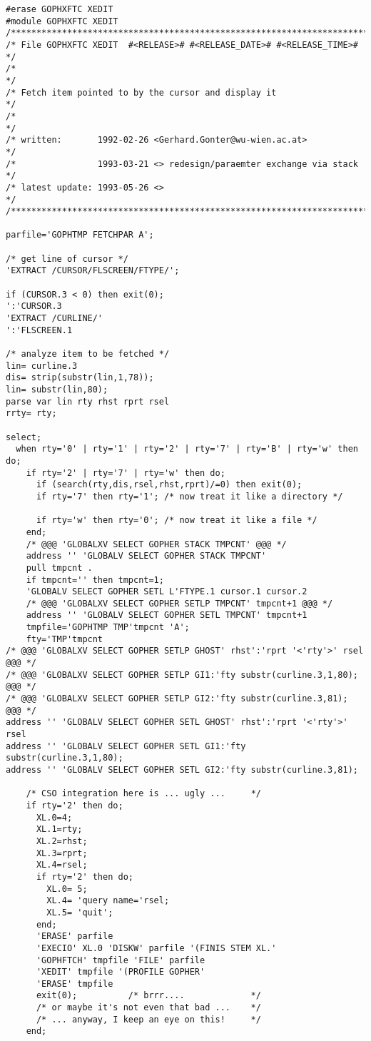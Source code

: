 \begin{verbatim}
#erase GOPHXFTC XEDIT
#module GOPHXFTC XEDIT
/***********************************************************************/
/* File GOPHXFTC XEDIT  #<RELEASE># #<RELEASE_DATE># #<RELEASE_TIME>#  */
/*                                                                     */
/* Fetch item pointed to by the cursor and display it                  */
/*                                                                     */
/* written:       1992-02-26 <Gerhard.Gonter@wu-wien.ac.at>            */
/*                1993-03-21 <> redesign/paraemter exchange via stack  */
/* latest update: 1993-05-26 <>                                        */
/***********************************************************************/

parfile='GOPHTMP FETCHPAR A';

/* get line of cursor */
'EXTRACT /CURSOR/FLSCREEN/FTYPE/';

if (CURSOR.3 < 0) then exit(0);
':'CURSOR.3
'EXTRACT /CURLINE/'
':'FLSCREEN.1

/* analyze item to be fetched */
lin= curline.3
dis= strip(substr(lin,1,78));
lin= substr(lin,80);
parse var lin rty rhst rprt rsel
rrty= rty;

select;
  when rty='0' | rty='1' | rty='2' | rty='7' | rty='B' | rty='w' then do;
    if rty='2' | rty='7' | rty='w' then do;
      if (search(rty,dis,rsel,rhst,rprt)/=0) then exit(0);
      if rty='7' then rty='1'; /* now treat it like a directory */

      if rty='w' then rty='0'; /* now treat it like a file */
    end;
    /* @@@ 'GLOBALXV SELECT GOPHER STACK TMPCNT' @@@ */
    address '' 'GLOBALV SELECT GOPHER STACK TMPCNT'
    pull tmpcnt .
    if tmpcnt='' then tmpcnt=1;
    'GLOBALV SELECT GOPHER SETL L'FTYPE.1 cursor.1 cursor.2
    /* @@@ 'GLOBALXV SELECT GOPHER SETLP TMPCNT' tmpcnt+1 @@@ */
    address '' 'GLOBALV SELECT GOPHER SETL TMPCNT' tmpcnt+1
    tmpfile='GOPHTMP TMP'tmpcnt 'A';
    fty='TMP'tmpcnt
/* @@@ 'GLOBALXV SELECT GOPHER SETLP GHOST' rhst':'rprt '<'rty'>' rsel @@@ */
/* @@@ 'GLOBALXV SELECT GOPHER SETLP GI1:'fty substr(curline.3,1,80); @@@ */
/* @@@ 'GLOBALXV SELECT GOPHER SETLP GI2:'fty substr(curline.3,81); @@@ */
address '' 'GLOBALV SELECT GOPHER SETL GHOST' rhst':'rprt '<'rty'>' rsel
address '' 'GLOBALV SELECT GOPHER SETL GI1:'fty substr(curline.3,1,80);
address '' 'GLOBALV SELECT GOPHER SETL GI2:'fty substr(curline.3,81);

    /* CSO integration here is ... ugly ...     */
    if rty='2' then do;
      XL.0=4;
      XL.1=rty;
      XL.2=rhst;
      XL.3=rprt;
      XL.4=rsel;
      if rty='2' then do;
        XL.0= 5;
        XL.4= 'query name='rsel;
        XL.5= 'quit';
      end;
      'ERASE' parfile
      'EXECIO' XL.0 'DISKW' parfile '(FINIS STEM XL.'
      'GOPHFTCH' tmpfile 'FILE' parfile
      'XEDIT' tmpfile '(PROFILE GOPHER'
      'ERASE' tmpfile
      exit(0);          /* brrr....             */
      /* or maybe it's not even that bad ...    */
      /* ... anyway, I keep an eye on this!     */
    end;


\end{verbatim}
